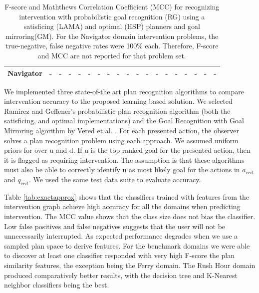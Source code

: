 \documentclass[doctor]{thesis} %
\theoremstyle{plain}
\begin{document}
\begin{table}[tb]
{\begin{tabular}{|l|ll|ll|ll|ll|ll|ll|ll|ll|ll|}
\textbf{Navigator}                            & -                       & -                        & -                       & -   & -                       & -   & -                        & -   & -                       & -   & -                       & -   & -                        & -   & -                       & -   & -                       & -   \\ \hline
\end{tabular}%
}
\caption{F-score and Maththews Correlation Coefficient (MCC) for recognizing intervention with probabilistic goal recognition (RG) using a satisficing (LAMA) and optimal (HSP) planners and goal mirroring(GM). For the Navigator domain intervention problems, the true-negative, false negative rates were 100\%  each. Therefore, F-score and MCC are not reported for that problem set.}
\label{tab:rgv}
\end{table}

We implemented three state-of-the art plan recognition algorithms to compare intervention accuracy to the proposed learning based solution. We selected Ramirez and Geffener's probabilistic plan recognition algorithm \cite{ramirez2010probabilistic} (both the satisficing, and optimal implementations) and the Goal Recognition with Goal Mirroring algorithm by Vered et al. . 
For each presented action, the observer solves a plan recognition problem using each approach. We assumed uniform priors for over $\mathrm{u}$ and $\mathrm{d}$. If $\mathrm{u}$ is the top ranked goal for the presented action, then it is flagged as requiring intervention. The assumption is that these algorithms must also be able to correctly identify $\mathrm{u}$ as most likely goal for the actions in $a_{crit}$ and $q_{crit}$. We used the same test data suite to evaluate accuracy.

Table \ref{tab:exactapprox} shows that the classifiers trained with features from the intervention graph achieve high accuracy for all the domains when predicting intervention. The MCC value shows that the class size does not bias the classifier. Low false positives and false negatives suggests that the user will not be unnecessarily interrupted. As expected performance degrades when we use a sampled plan space to derive features. For the benchmark domains we were able to discover at least one classifier responded with very high F-score the plan similarity features, the exception being the Ferry domain. The Rush Hour domain produced comparatively better results, with the decision tree and K-Nearest neighbor classifiers being the best. 
\end{document}
